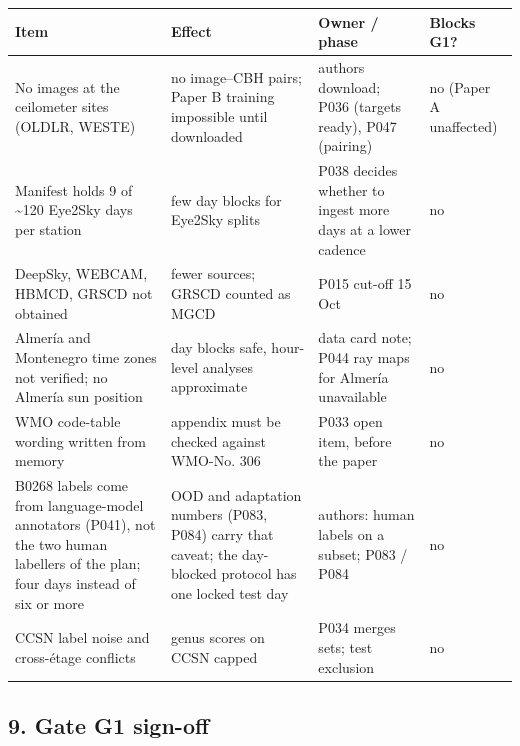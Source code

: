 \begin{center}{\scriptsize\setlength{\tabcolsep}{3pt}
\begin{tabular}{p{5.2cm}p{5.2cm}p{3.4cm}l}
\toprule
Item & Effect & Owner / phase & Blocks G1? \\
\midrule
No images at the ceilometer sites (OLDLR, WESTE) & no image–CBH pairs; Paper B training impossible until downloaded & authors download; P036 (targets ready), P047 (pairing) & no (Paper A unaffected) \\
Manifest holds 9 of \textasciitilde{}120 Eye2Sky days per station & few day blocks for Eye2Sky splits & P038 decides whether to ingest more days at a lower cadence & no \\
DeepSky, WEBCAM, HBMCD, GRSCD not obtained & fewer sources; GRSCD counted as MGCD & P015 cut-off 15 Oct & no \\
Almería and Montenegro time zones not verified; no Almería sun position & day blocks safe, hour-level analyses approximate & data card note; P044 ray maps for Almería unavailable & no \\
WMO code-table wording written from memory & appendix must be checked against WMO-No. 306 & P033 open item, before the paper & no \\
B0268 labels come from language-model annotators (P041), not the two human labellers of the plan; four days instead of six or more & OOD and adaptation numbers (P083, P084) carry that caveat; the day-blocked protocol has one locked test day & authors: human labels on a subset; P083 / P084 & no \\
CCSN label noise and cross-étage conflicts & genus scores on CCSN capped & P034 merges sets; test exclusion & no \\
\bottomrule
\end{tabular}}
\end{center}

\subsection{9. Gate G1 sign-off}

